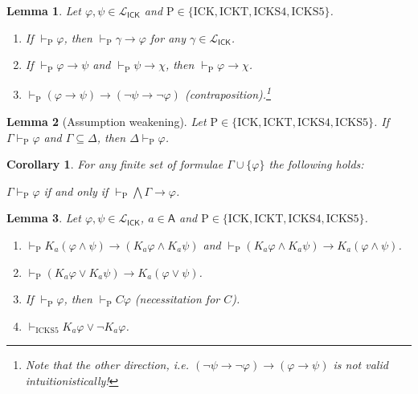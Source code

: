 \documentclass[10pt,a4paper]{amsart}
\newtheorem{lemma}{Lemma}
\newtheorem{corollary}{Corollary}
\newcommand\A{\mathsf{A}}
\newcommand\C {C}
\newcommand{\ICK}{\mathsf{ICK}}
\newcommand{\K}{K}
\newcommand{\LICK}{\mathcal{L}_{\ICK}}
\newcommand{\agi}{a}
\newcommand{\hick}{\mathrm{ICK}}
\newcommand{\hickp}{\mathrm{P}}
\newcommand{\hicks}{\mathrm{ICKS4}}
\newcommand{\hickss}{\mathrm{ICKS5}}
\newcommand{\hickt}{\mathrm{ICKT}}
\begin{document}
\begin{lemma}\label{l: derivable formulae}
    Let $\varphi, \psi \in \LICK$ and $\hickp \in \{\hick, \hickt, \hicks, \hickss\}$.
    \begin{enumerate}
    \item\label{l: derivable formulae item 1} If $\vdash_\hickp \varphi$, then $\vdash_\hickp \gamma \rightarrow \varphi$ for any $\gamma \in \LICK$.
    \item\label{l: derivable formulae item 2} If $\vdash_{\hickp} \varphi \rightarrow \psi$ and $\vdash_{\hickp} \psi \rightarrow \chi$, then $\vdash_{\hickp} \varphi \rightarrow \chi$.
    \item\label{l: derivable formulae item 3} $\vdash_\hickp (\varphi \rightarrow \psi) \rightarrow (\neg \psi \rightarrow \neg \varphi)$ (contraposition).\footnote{Note that the other direction, i.e. $(\neg \psi \rightarrow \neg \varphi) \rightarrow (\varphi \rightarrow \psi)$ is \emph{not} valid intuitionistically!}
    \end{enumerate}
\end{lemma}

\begin{lemma}[Assumption weakening] \label{l: assumption weakening}
    Let $\hickp \in \{\hick, \hickt, \hicks, \hickss\}$. If $\Gamma \vdash_\mathrm{P} \varphi$ and $\Gamma \subseteq \Delta$, then $\Delta \vdash_\mathrm{P} \varphi$.
\end{lemma}

\begin{corollary}\label{c: deduction theorem}
    For any finite set of formulae $\Gamma \cup \{\varphi\}$ the following holds:
    \begin{center}
        $\Gamma \vdash_\mathrm{P} \varphi$ if and only if $\vdash_\mathrm{P} \bigwedge \Gamma \rightarrow \varphi$.
    \end{center}
\end{corollary}

\begin{lemma}\label{l: derivable formulae 2}
   Let $\varphi, \psi \in \LICK$, $\agi \in \A$ and $\hickp \in \{\hick, \hickt, \hicks, \hickss\}$.
   \begin{enumerate}
       \item\label{l: derivable formulae 2 item 1} $\vdash_{\hickp} \K_\agi (\varphi \wedge \psi) \rightarrow (\K_\agi \varphi \wedge \K_\agi \psi)$ and $\vdash_{\hickp} (\K_\agi \varphi \wedge \K_\agi \psi) \rightarrow \K_\agi (\varphi \wedge \psi)$.
    \item\label{l: derivable formulae 2 item 2} $\vdash_{\hickp} (\K_\agi \varphi \vee \K_\agi \psi) \rightarrow \K_\agi (\varphi \vee \psi)$.
    \item\label{l: derivable formulae 2 item 3} If $\vdash_{\hickp} \varphi$, then $\vdash_{\hickp} \C \varphi$ (necessitation for $\C$).
    \item\label{l: derivable formulae 2 item 4} $\vdash_{\hickss} K_\agi \varphi \vee \neg K_\agi \varphi$.
   \end{enumerate}
\end{lemma}
\end{document}
